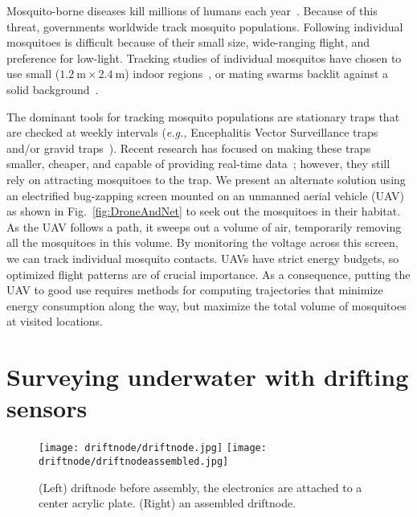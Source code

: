 Mosquito-borne diseases kill millions of humans each year~\cite{murray2012global}. 
Because of this threat, governments worldwide track mosquito populations.
Following individual mosquitoes is difficult because of their small size, wide-ranging flight, and preference for low-light.
Tracking studies of individual mosquitos have chosen to use small ($\SI{1.2}{\metre} \times \SI{2.4}{\metre}$) indoor regions~\cite{parker2015infrared}, or mating swarms backlit against a solid background~\cite{butail20113d}.

The dominant tools for tracking mosquito populations are stationary traps that are checked at weekly intervals (\textit{e.g.,} Encephalitis Vector Surveillance traps and/or gravid traps~\cite{williams2007comparison}). 
Recent research has focused on making these traps smaller, cheaper, and capable of providing real-time data~\cite{chen2014flying,linn2016building}; however, they still rely on attracting mosquitoes to the trap. 
We present an alternate solution using an electrified bug-zapping screen mounted on an unmanned aerial vehicle (UAV) as shown in Fig.~\ref{fig:DroneAndNet} to seek out the mosquitoes in their habitat.
As the UAV follows a path, it sweeps out a volume of air, temporarily removing all the mosquitoes in this volume.
By monitoring the voltage across this screen, we can track individual mosquito contacts.
UAVs have strict energy budgets, so optimized flight patterns are of crucial importance.
As a consequence, putting the UAV to good use requires methods for computing trajectories that minimize energy consumption along the way, but maximize the total volume of mosquitoes at visited locations.

\section[Drifting Sensors]{Surveying underwater with drifting sensors}

\begin{figure}[h]
	\begin{center}
	\texttt{[image: driftnode/driftnode.jpg]}
	\texttt{[image: driftnode/driftnodeassembled.jpg]}
	\caption[Driftnode Overview]{
		(Left) driftnode before assembly, the electronics are attached to a center acrylic plate.
		(Right) an assembled driftnode.
	} \label{fig:driftnodeoverview}
	\end{center}
\end{figure}

